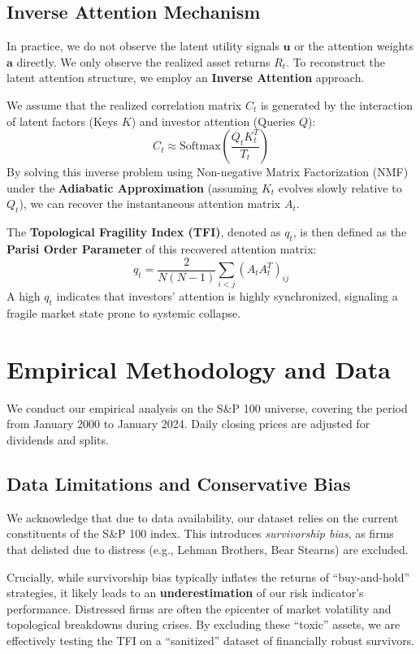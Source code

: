 \documentclass[preprint,12pt]{elsarticle}
\begin{document}
\subsection{Inverse Attention Mechanism}
In practice, we do not observe the latent utility signals $\mathbf{u}$ or the attention weights $\mathbf{a}$ directly. We only observe the realized asset returns $R_t$. To reconstruct the latent attention structure, we employ an \textbf{Inverse Attention} approach.

We assume that the realized correlation matrix $C_t$ is generated by the interaction of latent factors (Keys $K$) and investor attention (Queries $Q$):
\begin{equation}
    C_t \approx \text{Softmax}\left(\frac{Q_t K_t^T}{T_t}\right)
\end{equation}
By solving this inverse problem using Non-negative Matrix Factorization (NMF) under the \textbf{Adiabatic Approximation} (assuming $K_t$ evolves slowly relative to $Q_t$), we can recover the instantaneous attention matrix $A_t$.

The \textbf{Topological Fragility Index (TFI)}, denoted as $q_t$, is then defined as the \textbf{Parisi Order Parameter} of this recovered attention matrix:
\begin{equation}
    q_t = \frac{2}{N(N-1)} \sum_{i<j} (A_t A_t^T)_{ij}
\end{equation}
A high $q_t$ indicates that investors' attention is highly synchronized, signaling a fragile market state prone to systemic collapse.

\section{Empirical Methodology and Data}
We conduct our empirical analysis on the S\&P 100 universe, covering the period from January 2000 to January 2024. Daily closing prices are adjusted for dividends and splits.

\subsection{Data Limitations and Conservative Bias}
\label{sec:bias}

We acknowledge that due to data availability, our dataset relies on the current constituents of the S\&P 100 index. This introduces \textit{survivorship bias}, as firms that delisted due to distress (e.g., Lehman Brothers, Bear Stearns) are excluded.

Crucially, while survivorship bias typically inflates the returns of ``buy-and-hold'' strategies, it likely leads to an \textbf{underestimation} of our risk indicator's performance. Distressed firms are often the epicenter of market volatility and topological breakdowns during crises. By excluding these ``toxic'' assets, we are effectively testing the TFI on a ``sanitized'' dataset of financially robust survivors.
\end{document}
